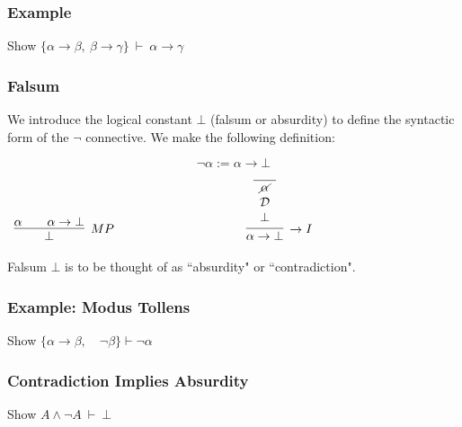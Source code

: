 \documentclass{beamer}
\theoremstyle{indentDefn} \newtheorem{defn}[]{Definition}
\begin{document}
\begin{frame}
	\frametitle{Example}
	
	Show $\{\alpha \rightarrow \beta, \ \beta \rightarrow \gamma\} \ \vdash \ \alpha \rightarrow \gamma$
	
	\vspace{7cm}
	
\end{frame}

\begin{frame}
	\frametitle{Falsum}
	
	We introduce the logical constant $\bot$ (falsum or absurdity) to define the syntactic form of the $\lnot$ connective. We make the following definition: 
	
	$$\lnot \alpha:= \alpha \rightarrow \bot$$
	
	\vspace{0.5cm}
	
	\begin{center}
		$\begin{array} { c c c }
		
		\infer[MP]{\bot}{\alpha \quad & \alpha \rightarrow \bot}
		
		& \hspace{3cm} &
		
		\infer[\rightarrow I]{\alpha \rightarrow \bot}{\begin{array}{c} 
			\hline \cancel{\alpha} \\
			\mathcal{D} \\ 
			\bot			
		\end{array}}		
		
		\end{array}$
	\end{center}
	
	\vspace{1cm}
	
	Falsum $\bot$ is to be thought of as ``absurdity" or ``contradiction". 
	
\end{frame}

\begin{frame}
	\frametitle{Example: Modus Tollens}	
	
	Show $\{\alpha \rightarrow \beta, \quad \lnot\beta\} \vdash \lnot \alpha$
	
	\vspace{7cm}
	
\end{frame}

\begin{frame}
	\frametitle{Contradiction Implies Absurdity}
	
	Show $A \land \lnot A \ \vdash \ \bot$
	
	\vspace{7cm}
	
\end{frame}
\end{document}
